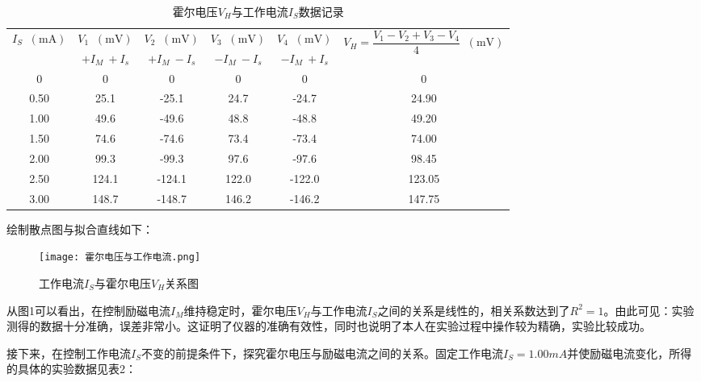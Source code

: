 \documentclass[11pt]{article}
\newcommand*{\unit}[1]{\mathop{}\!\mathrm{#1}}
\begin{document}
\begin{table}[H]
  \centering
  \caption{霍尔电压$V_H$与工作电流$I_S$数据记录}
  \begin{tabular}{|c|c|c|c|c|c|}
      \hline
      \multirow{2}{*}{$I_S\unit{(mA)}$}&$V_1\unit{(mV)}$&$V_2\unit{(mV)}$&$V_3\unit{(mV)}$&$V_4\unit{(mV)}$&\multirow{2}{*}{$V_H = \dfrac{V_1 - V_2 + V_3 - V_4}{4} \unit{(mV)}$}\\
      \cline{2-5}
      &$+I_M \ +I_s$&$+I_M \ -I_s$&$-I_M \ -I_s$&$-I_M \ +I_s$&\\
      \hline
      0 & 0 & 0 & 0 & 0 & 0 \\ \hline
      0.50 & 25.1 & -25.1 & 24.7 & -24.7 & 24.90 \\ \hline
      1.00 & 49.6 & -49.6 & 48.8 & -48.8 & 49.20 \\ \hline
      1.50 & 74.6 & -74.6 & 73.4 & -73.4 & 74.00 \\ \hline
      2.00 & 99.3 & -99.3 & 97.6 & -97.6 & 98.45 \\ \hline
      2.50 & 124.1 & -124.1 & 122.0 & -122.0 & 123.05 \\ \hline
      3.00 & 148.7 & -148.7 & 146.2 & -146.2 & 147.75 \\ \hline
  \end{tabular}
\end{table}

绘制散点图与拟合直线如下：

\begin{figure}[H]
  \centering
  \texttt{[image: 霍尔电压与工作电流.png]}
  \caption{工作电流$I_S$与霍尔电压$V_H$关系图}
\end{figure}

从图1可以看出，在控制励磁电流$I_M$维持稳定时，霍尔电压$V_H$与工作电流$I_S$之间的关系是线性的，相关系数达到了$R^2=1$。由此可见：实验测得的数据十分准确，误差非常小。这证明了仪器的准确有效性，同时也说明了本人在实验过程中操作较为精确，实验比较成功。

接下来，在控制工作电流$I_S$不变的前提条件下，探究霍尔电压与励磁电流之间的关系。固定工作电流$I_S = 1.00mA$并使励磁电流变化，所得的具体的实验数据见表2：
\end{document}

